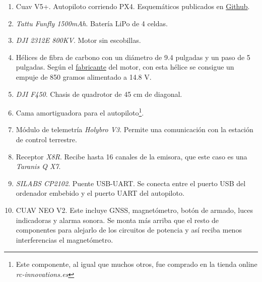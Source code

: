 \begin{enumerate}
\item Cuav V5+. Autopiloto corriendo PX4. Esquemáticos publicados en \href{https://github.com/ArduPilot/Schematics/tree/master/CUAV/V5_Autopilot/V5\%2B}{Github}.
\item \textit{Tattu Funfly 1500mAh}. Batería LiPo de 4 celdas.
\item \textit{DJI 2312E 800KV}. Motor sin escobillas.
\item Hélices de fibra de carbono con un diámetro de 9.4 pulgadas y un paso de 5 pulgadas. Según el \href{https://www.dji.com/e305/spec}{fabricante} del motor, con esta hélice se consigue un empuje de 850 gramos alimentado a 14.8 V.
\item \textit{DJI F450}. Chasis de quadrotor de 45 cm de diagonal. 
\item Cama amortiguadora para el autopiloto\footnote{Este componente, al igual que muchos otros, fue comprado en la tienda online \textit{rc-innovations.es}}.
\item Módulo de telemetría \textit{Holybro V3}. Permite una comunicación con la estación de control terrestre.
\item Receptor \textit{X8R}. Recibe hasta 16 canales de la emisora, que este caso es una \textit{Taranis Q X7}. 
\item \textit{SILABS CP2102}. Puente USB-UART. Se conecta entre el puerto USB del ordenador embebido y el puerto UART del autopiloto.
\item CUAV NEO V2. Este incluye GNSS, magnetómetro, botón de armado, luces indicadoras y alarma sonora. Se monta más arriba que el resto de componentes para alejarlo de los circuitos de potencia y así reciba menos interferencias el magnetómetro.


\end{enumerate}
